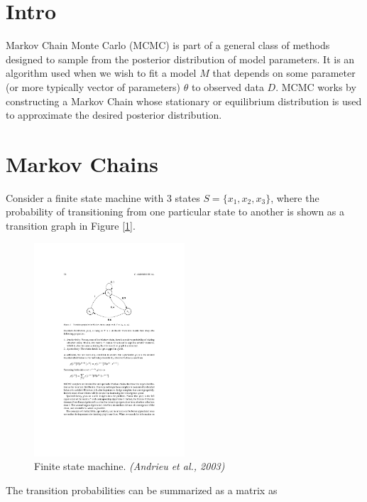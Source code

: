 
\section{Intro}

    Markov Chain Monte Carlo (MCMC) is part of a general class of methods designed to sample from the posterior distribution of model parameters. It is an algorithm used when we wish to fit a model $M$ that depends on some parameter (or more typically vector of parameters) $\theta$ to observed data $D$. MCMC works by constructing a Markov Chain whose stationary or equilibrium distribution is used to approximate the desired posterior distribution.


\section{Markov Chains}

    Consider a finite state machine with 3 states $S = \{x_1, x_2, x_3\}$, where the probability of transitioning from one particular state to another is shown as a transition graph in Figure [\ref{fsm}]. 

    \begin{figure}
        \centering
        \captionsetup{width=0.8\linewidth}
        \includegraphics[width=0.5\textwidth]{./images/finitemachine.pdf}
        \caption{Finite state machine. \textit{(Andrieu et al., 2003)} \label{fsm}}
    \end{figure}

    The transition probabilities can be summarized as a matrix as

